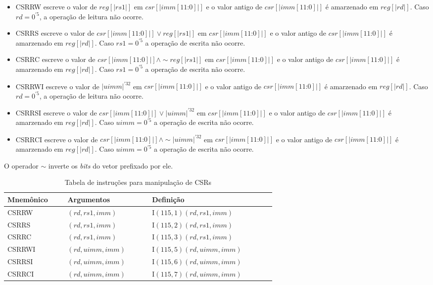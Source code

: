   \begin{itemize}
    \item CSRRW escreve o valor de $reg[|rs1|]$ em $csr[|imm[11\text{:}0]|]$ e o valor antigo de $csr[|imm[11\text{:}0]|]$
          é amarzenado em $reg[|rd|]$. Caso $rd = 0^{'5}$, a operação de leitura não ocorre.
    \item CSRRS escreve o valor de $csr[|imm[11\text{:}0]|] \lor reg[|rs1|]$ em $csr[|imm[11\text{:}0]|]$ e o valor antigo 
    de $csr[|imm[11\text{:}0]|]$ é amarzenado em $reg[|rd|]$.
    Caso $rs1 = 0^{'5}$ a operação de escrita não ocorre.
    \item CSRRC escreve o valor de $csr[|imm[11\text{:}0]|] \land \sim\! reg[|rs1|]$ em $csr[|imm[11\text{:}0]|]$ e o valor antigo 
    de $csr[|imm[11\text{:}0]|]$ é amarzenado em $reg[|rd|]$. 
    Caso $rs1 = 0^{'5}$ a operação de escrita não ocorre.
    \item CSRRWI escreve o valor de $|uimm|^{'32}$ em $csr[|imm[11\text{:}0]|]$ e o valor antigo de $csr[|imm[11\text{:}0]|]$
    é amarzenado em $reg[|rd|]$. Caso $rd = 0^{'5}$, a operação de leitura não ocorre.
    \item CSRRSI escreve o valor de $csr[|imm[11\text{:}0]|] \lor |uimm|^{'32}$ em $csr[|imm[11\text{:}0]|]$ e o valor antigo 
    de $csr[|imm[11\text{:}0]|]$ é amarzenado em $reg[|rd|]$. Caso $uimm = 0^{'5}$ a operação de escrita não ocorre.
    \item CSRRCI escreve o valor de $csr[|imm[11\text{:}0]|] \land \sim\! |uimm|^{'32}$ em $csr[|imm[11\text{:}0]|]$ e o valor antigo 
    de $csr[|imm[11\text{:}0]|]$ é amarzenado em $reg[|rd|]$. Caso $uimm = 0^{'5}$ a operação de escrita não ocorre.
  \end{itemize} 

  O operador $\sim$ inverte os \emph{bits} do vetor prefixado por ele.

  \begin{table}
    \begin{tabular}{ |p{0.13\linewidth}||p{0.2\linewidth}|p{0.3\linewidth}| } 
      \hline
      Mnemônico & Argumentos & Definição\\ \hline \hline

CSRRW & $(rd, rs1, imm)$ & I$(115, 1)(rd, rs1, imm)$ \\ \hline
CSRRS & $(rd, rs1, imm)$ & I$(115, 2)(rd, rs1, imm)$ \\ \hline
CSRRC & $(rd, rs1, imm)$ & I$(115, 3)(rd, rs1, imm)$ \\ \hline
CSRRWI & $(rd, uimm, imm)$ & I$(115, 5)(rd, uimm, imm)$ \\ \hline
CSRRSI & $(rd, uimm, imm)$ & I$(115, 6)(rd, uimm, imm)$ \\ \hline
CSRRCI & $(rd, uimm, imm)$ & I$(115, 7)(rd, uimm, imm)$ \\ \hline

    \end{tabular}
  \caption{Tabela de instruções para manipulação de CSRs \label{tab:csr}}
  \end{table}

